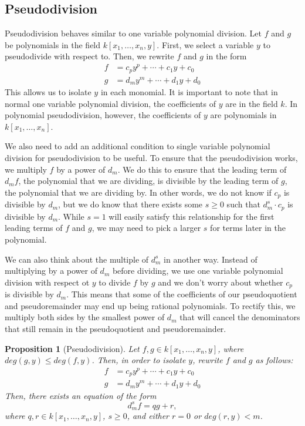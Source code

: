 \documentclass{article}
\theoremstyle{plain}
\newtheorem{Proposition}[Theorem]{Proposition}
\theoremstyle{definition}
\theoremstyle{remark}
\begin{document}
\subsection{Pseudodivision}
Pseudodivision behaves similar to one variable polynomial division. Let $f$ and $g$ be polynomials in the field $k[x_1,\dots,x_n,y]$.
First, we select a variable $y$ to pseudodivide with respect to. Then, we rewrite $f$ and $g$ in the form 
\begin {align*}
    f & = c_py^p + \cdots + c_1y + c_0\\
    g & = d_my^m + \cdots + d_1y + d_0
\end{align*}
This allows us to isolate $y$ in each monomial. It is important to note that in normal one variable polynomial division, the coefficients of $y$ are in the field $k$. 
In polynomial pseudodivision, however, the coefficients of $y$ are polynomials in $k[x_1,\dots,x_n]$.

We also need to add an additional condition to single variable polynomial division for pseudodivision to be useful. 
To ensure that the pseudodivision works, we multiply $f$ by a power of $d_m$. 
We do this to ensure that the leading term of $d_m f$, the polynomial that we are dividing, is divisible by the leading term of $g$, the polynomial that we are dividing by. 
In other words, we do not know if $c_p$ is divisible by $d_m$, but we do know that there exists some $s \geq 0$ such that $d_m^s\cdot c_p$ is divisible by $d_m$.
While $s = 1$ will easily satisfy this relationship for the first leading terms of $f$ and $g$, we may need to pick a larger $s$ for terms later in the polynomial.

We can also think about the multiple of $d_m^s$ in another way. 
Instead of multiplying by a power of $d_m$ before dividing, we use one variable polynomial division with respect ot $y$ to divide $f$ by $g$ and we don't worry about whether $c_p$ is divisible by $d_m$. 
This means that some of the coefficients of our pseudoquotient and pseudoremainder may end up being rational polynomials. 
To rectify this, we multiply both sides by the smallest power of $d_m$ that will cancel the denominators that still remain in the pseudoquotient and pseudoremainder.
\begin{Proposition}[Pseudodivision]
Let $f, g \in k[x_1,\dots,x_n,y]$, where $deg(g,y) \leq deg(f,y)$. Then, in order to isolate $y$, rewrite $f$ and $g$ as follows:
\begin {align*}
    f & = c_py^p + \cdots + c_1y + c_0\\
    g & = d_my^m + \cdots + d_1y + d_0
\end{align*}
Then, there exists an equation of the form $$d_m^s f = qg + r,$$ where $q,r \in k[x_1,\dots,x_n,y]$, $s \geq 0$, and either $r = 0$ or $deg(r,y) < m$.
\end{Proposition}
\end{document}
